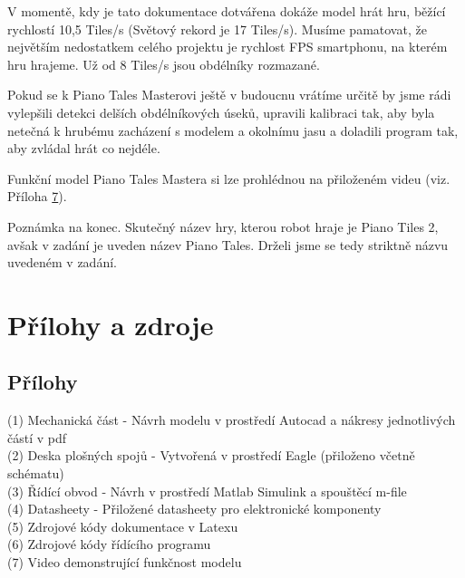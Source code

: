 \documentclass[12pt,oneside]{book} %
\begin{document}
\qquad V momentě, kdy je tato dokumentace dotvářena dokáže model hrát hru, běžící rychlostí 10,5 Tiles/s (Světový rekord je 17 Tiles/s). Musíme pamatovat, že největším nedostatkem celého projektu je rychlost FPS smartphonu, na kterém hru hrajeme. Už od 8 Tiles/s jsou obdélníky rozmazané.

\qquad Pokud se k Piano Tales Masterovi ještě v budoucnu vrátíme určitě by jsme rádi vylepšili detekci delších obdélníkových úseků, upravili kalibraci tak, aby byla netečná k hrubému zacházení s modelem a okolnímu jasu a  doladili program tak, aby zvládal hrát co nejdéle.

\qquad Funkční model Piano Tales Mastera si lze prohlédnou na přiloženém videu (viz. Příloha \hyperref[Prilohy]{7}).

\qquad Poznámka na konec. Skutečný název hry, kterou robot hraje je Piano Tiles 2, avšak v zadání je uveden název Piano Tales. Drželi jsme se tedy striktně názvu uvedeném v zadání.
\part{Přílohy a zdroje}\label{Pril_zdr}

\chapter{Přílohy}\label{Prilohy}

(1) Mechanická část - Návrh modelu v prostředí Autocad a nákresy jednotlivých částí v pdf\\
(2) Deska plošných spojů - Vytvořená v prostředí Eagle (přiloženo včetně schématu)\\
(3) Řídící obvod - Návrh v prostředí Matlab Simulink a spouštěcí m-file\\
(4) Datasheety - Přiložené datasheety pro elektronické komponenty\\
(5) Zdrojové kódy dokumentace v Latexu\\
(6) Zdrojové kódy řídícího programu\\
(7) Video demonstrující funkčnost modelu
\end{document}
